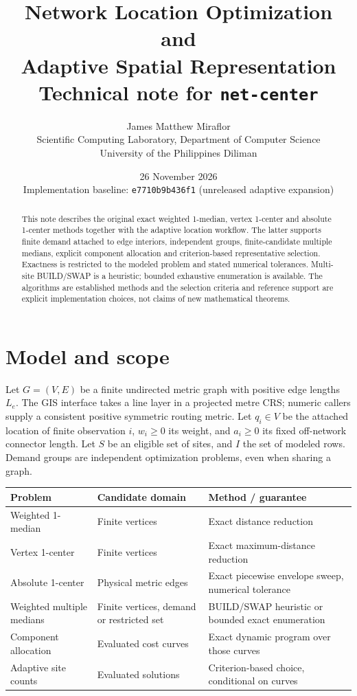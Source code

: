 \documentclass[11pt,a4paper]{article}
\title{\textbf{Network Location Optimization and\\Adaptive Spatial Representation}\\[8pt]\large Technical note for \texttt{net-center}}
\author{James Matthew Miraflor\\\small Scientific Computing Laboratory, Department of Computer Science\\\small University of the Philippines Diliman}
\date{26 November 2026\\\small Implementation baseline: \texttt{e7710b9b436f1} (unreleased adaptive expansion)}
\begin{document}
\maketitle
\begin{abstract}
\noindent This note describes the original exact weighted 1-median, vertex 1-center and absolute 1-center methods together with the adaptive location workflow. The latter supports finite demand attached to edge interiors, independent groups, finite-candidate multiple medians, explicit component allocation and criterion-based representative selection. Exactness is restricted to the modeled problem and stated numerical tolerances. Multi-site BUILD/SWAP is a heuristic; bounded exhaustive enumeration is available. The algorithms are established methods and the selection criteria and reference support are explicit implementation choices, not claims of new mathematical theorems.
\end{abstract}
\setcounter{tocdepth}{1}
\tableofcontents
\clearpage
\section{Model and scope}
Let $G=(V,E)$ be a finite undirected metric graph with positive edge lengths $L_e$. The GIS interface takes a line layer in a projected metre CRS; numeric callers supply a consistent positive symmetric routing metric. Let $q_i\in V$ be the attached location of finite observation $i$, $w_i\ge0$ its weight, and $a_i\ge0$ its fixed off-network connector length. Let $S$ be an eligible set of sites, and $I$ the set of modeled rows. Demand groups are independent optimization problems, even when sharing a graph.

\begin{tabularx}{\linewidth}{@{}p{.27\linewidth} X X@{}}
\toprule
Problem & Candidate domain & Method / guarantee \\
\midrule
Weighted 1-median & Finite vertices & Exact distance reduction \\
Vertex 1-center & Finite vertices & Exact maximum-distance reduction \\
Absolute 1-center & Physical metric edges & Exact piecewise envelope sweep, numerical tolerance \\
Weighted multiple medians & Finite vertices, demand or restricted set & BUILD/SWAP heuristic or bounded exact enumeration \\
Component allocation & Evaluated cost curves & Exact dynamic program over those curves \\
Adaptive site counts & Evaluated solutions & Criterion-based choice, conditional on curves \\
\bottomrule
\end{tabularx}
\end{document}
